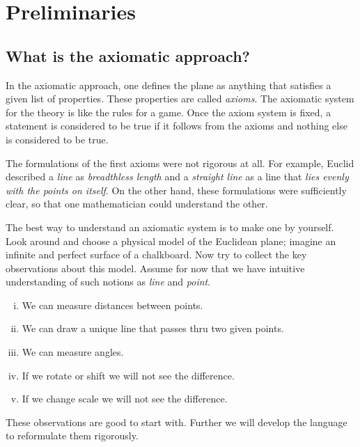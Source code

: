 \chapter{Preliminaries}\label{chap:metr}

\section*{What is the axiomatic approach?}

In the axiomatic approach, one defines the plane as anything that satisfies a given list of properties.
These properties are called {}\emph{axioms}.
The axiomatic system for the theory 
is like the rules for a game.
Once the axiom system is fixed, a statement is considered to be true if it follows from the axioms and nothing else is considered to be true.

The formulations of the first axioms were not rigorous at all.
For example, Euclid described a {}\emph{line} as {}\emph{breadthless length}
and a {}\emph{straight line} as a line that {}\emph{lies evenly with the points on itself}.
On the other hand,
these formulations were sufficiently clear, 
so that one mathematician could understand the other.

The best way to understand an axiomatic system
is to make one by yourself.
Look around and choose a physical model 
of the Euclidean plane;
imagine an infinite and perfect surface of a chalkboard. 
Now try to collect the key observations
about this model.
Assume for now that we have intuitive understanding of such notions as {}\emph{line} and {}\emph{point}.
\begin{enumerate}[(i)]
 \item\label{preaxiomI} We can measure distances between points.
 \item\label{preaxiomII} We can draw a unique line 
 that passes thru two given points.
 \item\label{preaxiomIII} We can measure angles.
 \item\label{preaxiomIV} If we rotate or shift we will not see the difference.
 \item\label{preaxiomV} If we change scale we will not see the difference.
\end{enumerate}
These observations are good to start with.
Further we will develop the language
to reformulate them rigorously.

